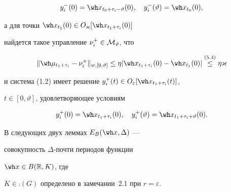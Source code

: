 \begin{equation*}


y_i^-(0)=\wh x_{t_0+\tau_i-\vartheta }(0),


\quad y_i^-(\vartheta)=\wh x_{t_0}(0),


\end{equation*}


а для точки $\wh x_{t_1}(0)\in O_{\varkappa}[\wh x_{t_1+\tau_i}(0)]$


найдется такое управление $\nu_i^+\in\cal M_\vartheta$, что


\begin{equation}


\|\wh\mu_{t_1+\tau_i}-\nu_i^+\|_{w,[0,\vartheta]}\le


\eta|\wh x_{t_1+\tau_i}(0)-\wh x_{t_1}(0)|


\up{(5.4)}{\le}\eta{\varkappa}


\end{equation}


и система (1.2) имеет решение $y_i^+(t)


\in O_\varepsilon[\wh x_{t_1+\tau_i}(t)]$,


$t\in[0,\vartheta]$, удовлетворяющее условиям


\begin{equation*}


y_i^+(0)=\wh x_{t_1+\tau_i}(0),


\quad y_i^+(\vartheta)=\wh x_{t_1+\tau_i+\vartheta }(0).


\end{equation*}





В следующих двух леммах $E_{B}(\wh x,\Delta)$ ---


совокупность $\Delta$-почти периодов функции


$\wh x\in B(\bR,K)$, где


$K\in\comp(G)$ определено в замечании~2.1 при $r=\varepsilon$.


\setcounter{footnote}{0}





